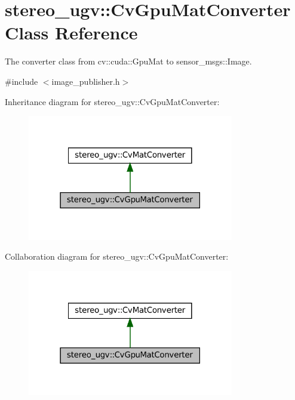 \hypertarget{classstereo__ugv_1_1CvGpuMatConverter}{}\section{stereo\+\_\+ugv\+:\+:Cv\+Gpu\+Mat\+Converter Class Reference}
\label{classstereo__ugv_1_1CvGpuMatConverter}


The converter class from cv\+::cuda\+::\+Gpu\+Mat to sensor\+\_\+msgs\+::\+Image.  




{\ttfamily \#include $<$image\+\_\+publisher.\+h$>$}



Inheritance diagram for stereo\+\_\+ugv\+:\+:Cv\+Gpu\+Mat\+Converter\+:\nopagebreak
\begin{figure}[H]
\begin{center}
\leavevmode
\includegraphics[width=255pt]{classstereo__ugv_1_1CvGpuMatConverter__inherit__graph}
\end{center}
\end{figure}


Collaboration diagram for stereo\+\_\+ugv\+:\+:Cv\+Gpu\+Mat\+Converter\+:\nopagebreak
\begin{figure}[H]
\begin{center}
\leavevmode
\includegraphics[width=255pt]{classstereo__ugv_1_1CvGpuMatConverter__coll__graph}
\end{center}
\end{figure}
